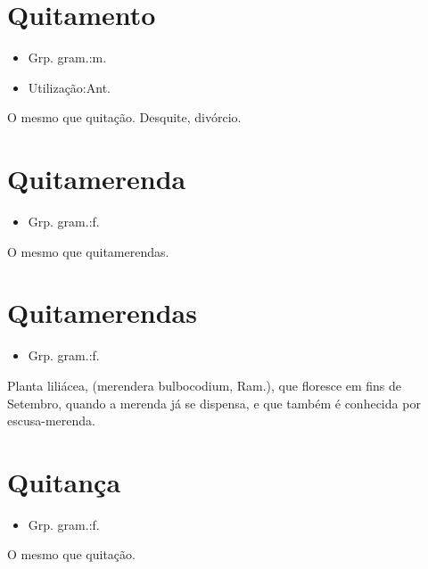 \section{Quitamento}
\begin{itemize}
\item {Grp. gram.:m.}
\end{itemize}
\begin{itemize}
\item {Utilização:Ant.}
\end{itemize}
O mesmo que \textunderscore quitação\textunderscore .
Desquite, divórcio.
\section{Quitamerenda}
\begin{itemize}
\item {Grp. gram.:f.}
\end{itemize}
O mesmo que \textunderscore quitamerendas\textunderscore .
\section{Quitamerendas}
\begin{itemize}
\item {Grp. gram.:f.}
\end{itemize}
Planta liliácea, (\textunderscore merendera bulbocodium\textunderscore , Ram.), que floresce em fins de Setembro, quando a merenda já se dispensa, e que também é conhecida por \textunderscore escusa-merenda\textunderscore .
\section{Quitança}
\begin{itemize}
\item {Grp. gram.:f.}
\end{itemize}
O mesmo que \textunderscore quitação\textunderscore .
